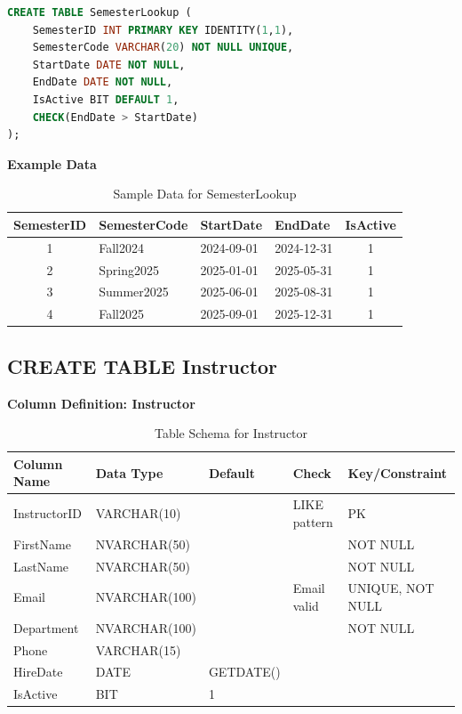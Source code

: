 \documentclass[12pt,a4paper]{report}
\begin{document}
\vspace{0.3cm}

\begin{lstlisting}[language=SQL, caption=Create Table SemesterLookup]
CREATE TABLE SemesterLookup (
    SemesterID INT PRIMARY KEY IDENTITY(1,1),
    SemesterCode VARCHAR(20) NOT NULL UNIQUE,
    StartDate DATE NOT NULL,
    EndDate DATE NOT NULL,
    IsActive BIT DEFAULT 1,
    CHECK(EndDate > StartDate)
);
\end{lstlisting}

\textbf{Example Data}

\begin{table}[ht]
\centering
\small
\begin{tabular}{|c|l|l|l|c|}
\hline
\textbf{SemesterID} & \textbf{SemesterCode} & \textbf{StartDate} & \textbf{EndDate} & \textbf{IsActive} \\ \hline
1 & Fall2024 & 2024-09-01 & 2024-12-31 & 1 \\ \hline
2 & Spring2025 & 2025-01-01 & 2025-05-31 & 1 \\ \hline
3 & Summer2025 & 2025-06-01 & 2025-08-31 & 1 \\ \hline
4 & Fall2025 & 2025-09-01 & 2025-12-31 & 1 \\ \hline
\end{tabular}
\caption{Sample Data for SemesterLookup}
\label{tab:semester_lookup_data}
\end{table}

\vspace{1cm}

% 
\subsection{CREATE TABLE Instructor}

\textbf{Column Definition: Instructor}

\begin{table}[ht]
\centering
\small
\begin{tabular}{|l|l|l|l|l|}
\hline
\textbf{Column Name} & \textbf{Data Type} & \textbf{Default} & \textbf{Check} & \textbf{Key/Constraint} \\ \hline
InstructorID & VARCHAR(10) & & LIKE pattern & PK \\ \hline
FirstName & NVARCHAR(50) & & & NOT NULL \\ \hline
LastName & NVARCHAR(50) & & & NOT NULL \\ \hline
Email & NVARCHAR(100) & & Email valid & UNIQUE, NOT NULL \\ \hline
Department & NVARCHAR(100) & & & NOT NULL \\ \hline
Phone & VARCHAR(15) & & & \\ \hline
HireDate & DATE & GETDATE() & & \\ \hline
IsActive & BIT & 1 & & \\ \hline
\end{tabular}
\caption{Table Schema for Instructor}
\label{tab:instructor_schema}
\end{table}
\end{document}
